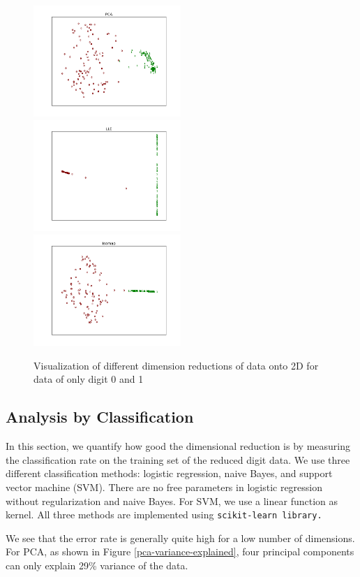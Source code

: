 \documentclass[11pt]{article}
\begin{document}
\begin{figure}[H]
\begin{center}
\includegraphics[width=2.2in]{pca2digit.png}
\includegraphics[width=2.2in]{lle2digit.png}
\includegraphics[width=2.2in]{isomap2digit.png}
\end{center}
\caption{Visualization of different dimension reductions of data onto 2D for data of only digit 0 and 1}
\label{reduce_2_digits}
\end{figure}

\subsection*{Analysis by Classification}
In this section, we quantify how good the dimensional reduction is by measuring the classification rate on the training set of the reduced digit data. We use three different classification methods: logistic regression, naive Bayes, and support vector machine (SVM). There are no free parameters in logistic regression without regularization and naive Bayes. For SVM, we use a linear function as kernel. All three methods are implemented using \tt scikit-learn \rm library.

We see that the error rate is generally quite high for a low number of dimensions. For PCA, as shown in Figure \ref{pca-variance-explained}, four principal components can only explain 29\% variance of the data.
\end{document}
